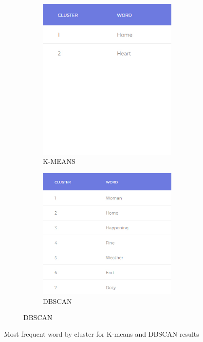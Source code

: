 \documentclass{article}
\begin{document}
\begin{figure}[H]
    \centering 
    \begin{subfigure}{1\textwidth}  
        \begin{subfigure}{.5\textwidth}
            \centering   
            \includegraphics[width=.8\linewidth]{./img/kmeantb.jpg}
            \caption{K-MEANS}
        \end{subfigure}
        \begin{subfigure}{.5\textwidth}  
            \centering 
            \includegraphics[width=1\linewidth]{./img/dbscantb.jpg}
            \caption{DBSCAN}
        \end{subfigure}                
    \end{subfigure}
    \caption{Most frequent word by cluster for K-means and DBSCAN results}
    \label{fig:table}
\end{figure}
\end{document}
